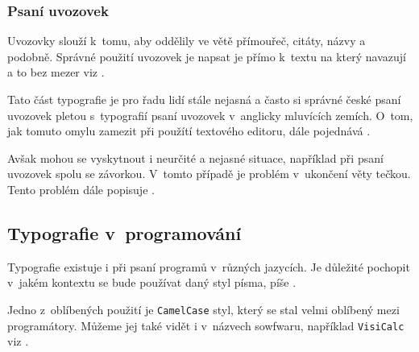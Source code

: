 \documentclass[a4paper, 11pt]{article}
\begin{document}
\subsubsection{Psaní uvozovek}
Uvozovky slouží k~tomu, aby oddělily ve větě přímouřeč, citáty, názvy a podobně. Správné použití uvozovek je napsat je přímo k~textu na který navazují a to bez mezer viz \cite{Nezbeda2018}.
\par
Tato část typografie je pro řadu lidí stále nejasná a často si správné české psaní uvozovek pletou s~typografií psaní uvozovek v~anglicky mluvících zemích. O~tom, jak tomuto omylu zamezit při použítí textového editoru, dále pojednává \cite{Konecny2015}.

Avšak mohou se vyskytnout i neurčité a nejasné situace, například při psaní uvozovek spolu se závorkou. V~tomto případě je problém v~ukončení věty tečkou. Tento problém dále popisuje \cite{Laurencik2018}.

\subsection{Typografie v~programování}
Typografie existuje i při psaní programů v~různých jazycích. Je důležité pochopit v~jakém kontextu se bude používat daný styl písma, píše \cite{Anonymni2009}.
\par
Jedno z~oblíbených použití je \texttt{CamelCase} styl, který se stal velmi oblíbený mezi programátory. Můžeme jej také vidět i v~názvech sowfwaru, například \texttt{VisiCalc} viz \cite{Walker2008}.


\newpage
\renewcommand{\refname}{Literatura}


\end{document}
